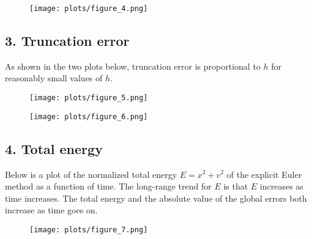 \documentclass{article}
\begin{document}
\begin{figure}[H]
\centering
\texttt{[image: plots/figure\_4.png]}
\end{figure}

\subsection*{3. Truncation error}
As shown in the two plots below, truncation error is proportional to $h$ for reasonably small values of $h$.
\begin{figure}[H]
\centering
\texttt{[image: plots/figure\_5.png]}
\end{figure}

\begin{figure}[H]
\centering
\texttt{[image: plots/figure\_6.png]}
\end{figure}

\subsection*{4. Total energy}
Below is a plot of the normalized total energy $E = x^2 + v^2$ of the explicit Euler method as a function of time. The long-range trend for $E$ is that $E$ increases as time increases. The total energy and the absolute value of the global errors both increase as time goes on.

\begin{figure}[H]
\centering
\texttt{[image: plots/figure\_7.png]}
\end{figure}
\end{document}
